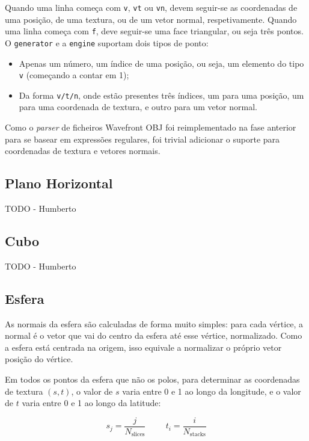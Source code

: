 \documentclass[12pt, a4paper]{article}
\begin{document}
Quando uma linha começa com \texttt{v}, \texttt{vt} ou \texttt{vn}, devem seguir-se as coordenadas
de uma posição, de uma textura, ou de um vetor normal, respetivamente. Quando uma linha começa com
\texttt{f}, deve seguir-se uma face triangular, ou seja três pontos. O \texttt{generator} e a
\texttt{engine} suportam dois tipos de ponto:

\begin{itemize}
    \item Apenas um número, um índice de uma posição, ou seja, um elemento do tipo \texttt{v}
        (começando a contar em 1);
    \item Da forma \texttt{v/t/n}, onde estão presentes três índices, um para uma posição, um para
        uma coordenada de textura, e outro para um vetor normal.
\end{itemize}

Como o \emph{parser} de ficheiros Wavefront OBJ foi reimplementado na fase anterior para se basear
em expressões regulares, foi trivial adicionar o suporte para coordenadas de textura e vetores
normais.

\subsection{Plano Horizontal}

{\color{red} TODO - Humberto}

\subsection{Cubo}

{\color{red} TODO - Humberto}

\subsection{Esfera}

As normais da esfera são calculadas de forma muito simples: para cada vértice, a normal é o vetor
que vai do centro da esfera até esse vértice, normalizado. Como a esfera está centrada na origem,
isso equivale a normalizar o próprio vetor posição do vértice.

Em todos os pontos da esfera que não os polos, para determinar as coordenadas de textura $(s, t)$, o
valor de $s$ varia entre 0 e 1 ao longo da longitude, e o valor de $t$ varia entre 0 e 1 ao longo da
latitude:

$$
s_j = \frac{j}{N_\text{slices}}
\hspace{1cm}
t_i = \frac{i}{N_\text{stacks}}
$$
\end{document}
